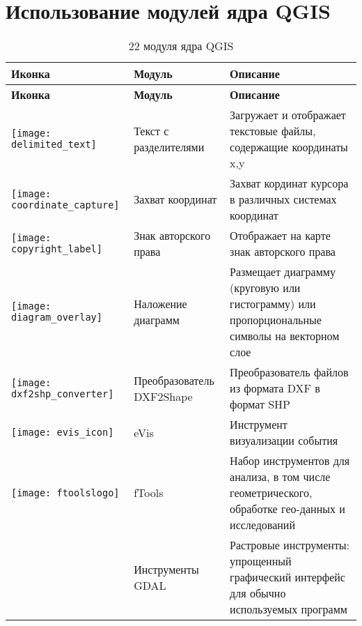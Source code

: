 
\chapter{Использование модулей ядра QGIS}\label{sec:core_plugins}


{\setlength{\extrarowheight}{15pt}
\small
\begin{longtable}{|p{1.2cm}|p{3.8cm}|p{10.5cm}|}
\caption{22 модуля ядра QGIS }\label{tab:core_plugins} \\
\hline
 \textbf{Иконка} & \textbf{Модуль} & \textbf{Описание}\\
\endfirsthead
\hline
\textbf{Иконка} & \textbf{Модуль} & \textbf{Описание}\\
\endhead
\hline
\texttt{[image: delimited\_text]}
 & Текст с разделителями \index{модули!текст с разделителями} & Загружает и отображает текстовые файлы, содержащие координаты x,y\\
\hline
\texttt{[image: coordinate\_capture]}
 & Захват координат \index{модули!захват координат}& Захват кординат курсора в различных системах координат\\
\hline
\texttt{[image: copyright\_label]}
 & Знак авторского права \index{модули!знак авторского права}& Отображает на карте знак авторского права\\
\hline
\texttt{[image: diagram\_overlay]}
 & Наложение диаграмм \index{модули!диаграмма}& Размещает диаграмму (круговую или гистограмму) или пропорциональные символы на векторном слое\\
\hline
\texttt{[image: dxf2shp\_converter]}
 & Преобразователь DXF2Shape \index{модули!DXF2Shape}& Преобразователь файлов из формата DXF в формат SHP\\
\hline
\texttt{[image: evis\_icon]}
 & eVis & Инструмент визуализации события \\
\hline
\texttt{[image: ftoolslogo]}
 & fTools \index{модули!fTools}& Набор инструментов для анализа, в том числе геометрического, обработке гео-данных и исследований \\
\hline
 & Инструменты GDAL \index{модули!GdalTools} & Растровые инструменты: упрощенный графический интерфейс для обычно используемых программ\\

\end{longtable}}

